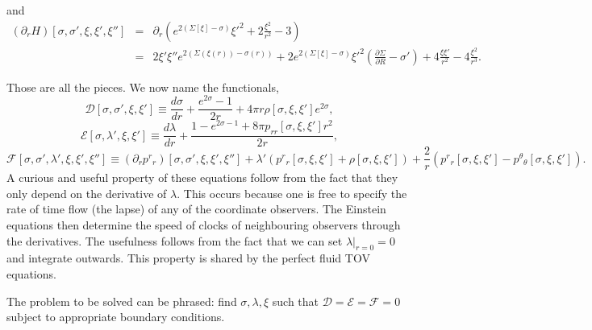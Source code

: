 and
\begin{eqnarray}
(\partial_rH)[\sigma,\sigma',\xi,\xi',\xi''] & = & \partial_r\left( e^{2(\Sigma[\xi]-\sigma)}\xi'^2 +
2\frac{\xi^2}{r^2} - 3\right) \\
& = & 2\xi'\xi''e^{2(\Sigma(\xi(r))-\sigma(r))} + 2e^{2(\Sigma[\xi]-\sigma)}\xi'^2\left(\frac{\partial \Sigma}{\partial R} - \sigma'\right) + 4\frac{\xi\xi'}{r^2} - 4\frac{\xi^2}{r^3}.
\end{eqnarray}

Those are all the pieces. We now name the functionals,
\begin{equation}
\mathcal{D}[\sigma,\sigma',\xi,\xi'] \equiv \frac{d\sigma}{dr} + \frac{e^{2\sigma}-1}{2r} + 4\pi r\rho[\sigma,\xi,\xi'] e^{2\sigma},
\label{eq:functionaltt}
\end{equation}
\begin{equation}
\mathcal{E}[\sigma,\lambda',\xi,\xi'] \equiv \frac{d\lambda}{dr} + \frac{1-e^{2\sigma-1}+8\pi p_{rr}[\sigma,\xi,\xi']r^2}{2r},
\label{eq:functionalrr}
\end{equation}
\begin{equation}
\mathcal{F}[\sigma,\sigma',\lambda',\xi,\xi',\xi''] \equiv 
(\partial_r p^r{}_r)[\sigma,\sigma',\xi,\xi',\xi''] + \lambda'
\left( p^r{}_r[\sigma,\xi,\xi'] + \rho[\sigma,\xi,\xi']\right)
+\frac{2}{r}\left(p^r{}_r[\sigma,\xi,\xi'] -
p^\theta{}_\theta[\sigma,\xi,\xi']\right).
\label{eq:functionalhydro}
\end{equation}
A curious and useful property of these equations follow from the fact that they only depend on the derivative of $\lambda$. This occurs because one is free to specify the rate of time flow (the lapse) of any of the coordinate observers. The Einstein equations then determine the speed of clocks of neighbouring observers through the derivatives. The usefulness follows from the fact that we can set $\lambda|_{r=0}=0$ and integrate outwards. This property is shared by the perfect fluid TOV equations. 

The problem to be solved can be phrased: find $\sigma,\lambda,\xi$ such that $\mathcal{D}=\mathcal{E}=\mathcal{F}=0$ subject to appropriate boundary conditions.
